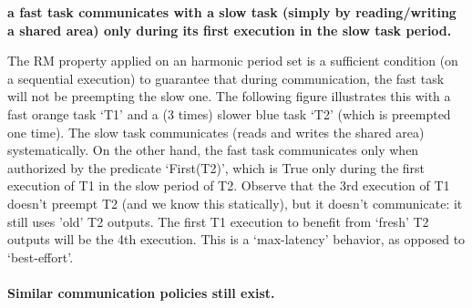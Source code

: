 \documentclass[a4paper]{article}
\begin{document}
\textbf{a fast task communicates with a slow task (simply by reading/writing a shared area) 
only during its first execution in the slow task period.}

The RM property applied on an harmonic period set is a sufficient condition (on a sequential execution) to guarantee that during communication,
the fast task will not be preempting the slow one.
The following figure illustrates this with a fast orange task `T1' and a (3 times) slower blue task `T2' (which is preempted one time).
The slow task communicates (reads and writes the shared area) systematically.
On the other hand, the fast task communicates only when authorized by the predicate `First(T2)',
which is True only during the first execution of T1 in the slow period of T2.
Observe that the 3rd execution of T1 doesn't preempt T2 (and we know this statically), but it doesn't communicate: it still uses 'old' T2 outputs.
The first T1 execution to benefit from `fresh' T2 outputs will be the 4th execution. 
This is a `max-latency' behavior, as opposed to `best-effort'.

\paragraph*{Similar communication policies still exist.}
\end{document}
